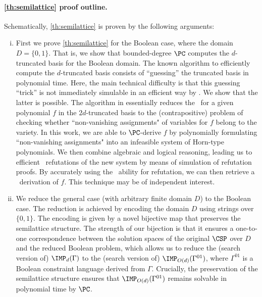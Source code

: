 \documentclass[11pt]{article}
\begin{document}
\paragraph{\cref{th:semilattice} proof outline.}\label{sect:semilattice_structure}
%
Schematically, \cref{th:semilattice} is proven by the following arguments:
\begin{enumerate}[(i)]
    \item First we prove \cref{th:semilattice} for the Boolean case, where the domain $D = \{0,1\}$.
    That is, we show that bounded-degree $\PC$ computes the $d$-truncated \GB basis for the Boolean domain. The known \cite{Mastrolilli21TALG} algorithm to efficiently compute the $d$-truncated \GB basis consists of ``guessing'' the truncated \GB basis in polynomial time. Here, the main technical difficulty is that this guessing ``trick'' is not immediately simulable in an efficient way by \PC. We show that the latter is possible. The algorithm in \cite{Mastrolilli21TALG} essentially reduces the \IMP\ for a given polynomial $f$ in the $2d$-truncated \GB basis to the (contrapositive) problem of checking whether ``non-vanishing assignments" of variables for $f$ belong to the variety. In this work, we are able to $\PC$-derive $f$ by polynomially formulating ``non-vanishing assignments" into an infeasible system of Horn-type polynomials. We then combine algebraic and logical reasoning, leading us to efficient \PC\ refutations of the new system by means of simulation of refutation proofs. By accurately using the \PC\ ability for refutation, we can then retrieve a \PC\ derivation of $f$. This technique may be of independent interest.
    \item We reduce the general case (with arbitrary finite domain $D$) to the Boolean case. The reduction is achieved by encoding the domain $D$ using strings over $\{0,1\}$. The encoding is given by a novel bijective map that preserves the semilattice structure. The strength of our bijection is that it ensures a one-to-one correspondence between the solution spaces of the original $\CSP$ over $D$ and the reduced Boolean problem, which allows us to reduce the (search version of) $\IMP_d(\Gamma)$ to the (search version of) $\IMP_{O(d)}(\Gamma^{01})$, where $\Gamma^{01}$ is a Boolean constraint language derived from $\Gamma$. Crucially, the preservation of the semilattice structure ensures that $\IMP_{O(d)}(\Gamma^{01})$ remains solvable in polynomial time by $\PC$.
 
\end{enumerate}
\end{document}
